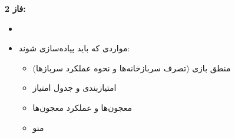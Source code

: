 \documentclass[]{article}
\begin{document}
\textbf{فاز 2:}
\begin{itemize}
    \item{
    }
    \item{
    مواردی که باید پیاده‌سازی شوند:
    \begin{itemize}
        \item{منطق بازی (تصرف سربازخانه‌ها و نحوه عملکرد سرباز‌ها)
}
        \item{امتیازبندی و جدول امتیاز
}
        \item{معجون‌ها و عملکرد معجون‌ها
        
}
        \item{منو

}
\end{itemize}
    }
\end{itemize}
\end{document}
